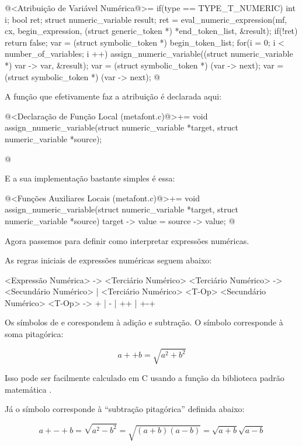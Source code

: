 \iniciocodigo
@<Atribuição de Variável Numérica@>=
if(type == TYPE_T_NUMERIC){
  int i;
  bool ret;
  struct numeric_variable result;
  ret = eval_numeric_expression(mf, cx, begin_expression,
                               (struct generic_token *) *end_token_list,
                                &result);
  if(!ret)
    return false;
  var = (struct symbolic_token *) begin_token_list;
  for(i = 0; i < number_of_variables; i ++){
    assign_numeric_variable((struct numeric_variable *) var -> var,
                            &result);
    var = (struct symbolic_token *) (var -> next);
    var = (struct symbolic_token *) (var -> next);
  }
}
@
\fimcodigo

A função que efetivamente faz a atribuição é declarada aqui:

\iniciocodigo
@<Declaração de Função Local (metafont.c)@>+=
void assign_numeric_variable(struct numeric_variable *target,
                            struct numeric_variable *source);

@
\fimcodigo

E a sua implementação bastante simples é essa:

\iniciocodigo
@<Funções Auxiliares Locais (metafont.c)@>+=
void assign_numeric_variable(struct numeric_variable *target,
                            struct numeric_variable *source){
  target -> value = source -> value;
}
@
\fimcodigo

Agora passemos para definir como interpretar expressões numéricas.


As regras iniciais de expressões numéricas seguem abaixo:

\alinhaverbatim
<Expressão Numérica> -> <Terciário Numérico>
<Terciário Numérico> -> <Secundário Numérico> |
                        <Terciário Numérico> <T-Op> <Secundário Numérico>
<T-Op> -> + | - | ++ | +-+
\alinhanormal

Os símbolos de \monoespaco{+} e \monoespaco{-} corespondem à adição e
subtração. O símbolo \monoespaco{++} corresponde à soma pitagórica:

$$
a ++ b = \sqrt{a^2 + b^2}
$$

Isso pode ser facilmente calculado em C usando a função da biblioteca
padrão matemática .

Já o símbolo \monoespaco{+-+} corresponde à ``subtração pitagórica''
definida abaixo:

$$
a +-+ b = \sqrt{a^2 - b^2} = \sqrt{(a+b)(a-b)} = \sqrt{a+b}\sqrt{a-b}
$$

